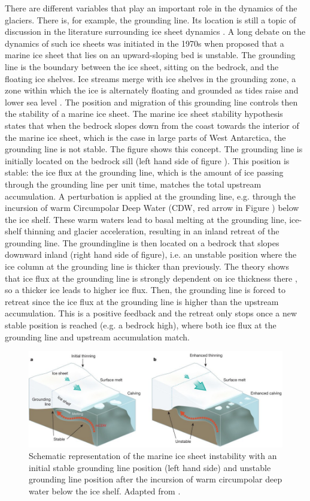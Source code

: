 \documentclass{article}
\begin{document}
There are different variables that play an important role in the dynamics of the glaciers. There is, for example, the grounding line. Its location is still a topic of discussion in the literature surrounding ice sheet dynamics \cite{goldberg2018representing}. A long debate on the dynamics of such ice sheets was initiated in the 1970s when \cite{weertman1974stability} proposed that a marine ice sheet that lies on an upward-sloping bed is unstable.
The grounding line is the boundary between the ice sheet, sitting on the bedrock, and the floating ice shelves. Ice streams merge with ice shelves in the grounding zone, a zone within which the ice is alternately ﬂoating and grounded as tides raise and lower sea level \cite{hooke2019principles}. The position and migration of this grounding line controls then the stability of a marine ice sheet.
The marine ice sheet stability hypothesis states that when the bedrock slopes down from the coast towards the interior of the marine ice sheet, which is the case in large parts of West Antarctica, the grounding line is not stable. The figure shows this concept. The grounding line is initially located on the bedrock sill (left hand side of figure ). This position is stable: the ice flux at the grounding line, which is the amount of ice passing through the grounding line per unit time, matches the total upstream accumulation.
A perturbation is applied at the grounding line, e.g. through the incursion of warm Circumpolar Deep Water (CDW, red arrow in Figure ) below the ice shelf. These warm waters lead to basal melting at the grounding line, ice-shelf thinning and glacier acceleration, resulting in an inland retreat of the grounding line. The groundingline is then located on a bedrock that slopes downward inland (right hand side of figure), i.e. an unstable position where the ice column at the grounding line is thicker than previously. The theory shows that ice flux at the grounding line is strongly dependent on ice thickness there \cite{weertman1974stability, schoof2007ice}, so a thicker ice leads to higher ice flux. Then, the grounding line is forced to retreat since the ice flux at the grounding line is higher than the upstream accumulation. This is a positive feedback and the retreat only stops once a new stable position is reached (e.g. a bedrock high), where both ice flux at the grounding line and upstream accumulation match.

\begin{figure}[!h]
	\centering
	\includegraphics[width=0.7\linewidth]{../fig/Grounding_line.png}
	\caption{Schematic representation of the marine ice sheet instability with an initial stable grounding line position (left hand side) and unstable grounding line position after the incursion of warm circumpolar deep water below the ice shelf. Adapted from \cite{hanna2013white}.}
	\label{grounding_line_instability}
\end{figure}
\end{document}
